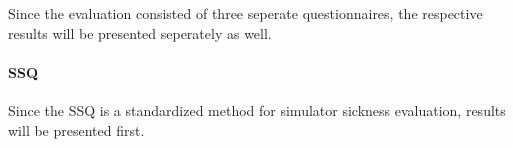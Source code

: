 Since the evaluation consisted of three seperate questionnaires, the respective results will be presented seperately as well.

\paragraph{SSQ}

Since the SSQ is a standardized method for simulator sickness evaluation, results will be presented first.
